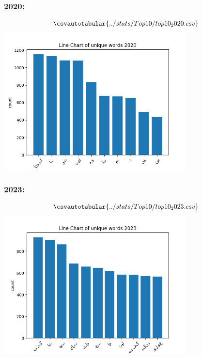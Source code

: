 \documentclass[a4paper]{article}
\begin{document}
\subsubsection{2020:}
\begin{align*}
	\csvautotabular{../stats/Top10/top10_2020.csv}
\end{align*} 
\includegraphics[width=0.75\textwidth]{../stats/Top10/top10chart2020.png}
\subsubsection{2023:}
\begin{align*}
	\csvautotabular{../stats/Top10/top10_2023.csv}
\end{align*} 
\includegraphics[width=0.75\textwidth]{../stats/Top10/top10chart2023.png}
\end{document}
